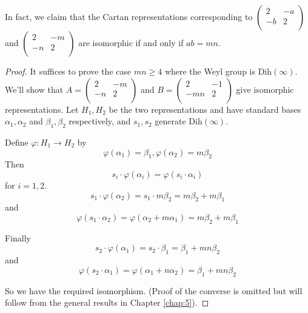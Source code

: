 \documentclass[11pt,a4paper]{report}
\theoremstyle{definition}
\begin{document}
In fact, we claim that the Cartan representations corresponding to $\begin{pmatrix}2 & -a\\-b & 2\\\end{pmatrix}$ and $\begin{pmatrix}2 & -m\\-n & 2\\\end{pmatrix}$ are isomorphic if and only if $ab = mn$.

\begin{proof} It suffices to prove the case $mn \geq 4$ where the Weyl group is $\text{Dih}(\infty)$. We'll show that $A = \begin{pmatrix}2 & -m\\-n & 2\\\end{pmatrix}$ and $B = \begin{pmatrix}2 & -1\\-mn & 2\\\end{pmatrix}$ give isomorphic representations. Let $H_1, H_2$ be the two representations and have standard bases $\alpha_1, \alpha_2$ and $\beta_1, \beta_2$ respectively, and $s_1, s_2$ generate $\text{Dih}(\infty)$.

Define $\varphi: H_1 \to H_2$ by \begin{equation*}\varphi(\alpha_1) = \beta_1, \varphi(\alpha_2) = m \beta_2\end{equation*} Then \begin{equation*}s_i \cdot \varphi(\alpha_i) = \varphi (s_i \cdot \alpha_i)\end{equation*} for $i = 1, 2$. \begin{equation*}s_1 \cdot \varphi(\alpha_2) = s_1 \cdot m \beta_2 = m \beta_2 + m \beta_1\end{equation*} and \begin{equation*}\varphi(s_1 \cdot \alpha_2) = \varphi(\alpha_2 + m \alpha_1) = m \beta_2 + m \beta_1\end{equation*} 

Finally \begin{equation*} s_2 \cdot \varphi(\alpha_1) = s_2 \cdot \beta_1 = \beta_1 + mn \beta_2\end{equation*} and \begin{equation*} \varphi(s_2 \cdot \alpha_1) = \varphi(\alpha_1 + n\alpha_2) = \beta_1 + mn \beta_2\end{equation*}

So we have the required isomorphism. (Proof of the converse is omitted but will follow from the general results in Chapter \ref{chap:5}).
\end{proof}
\end{document}
